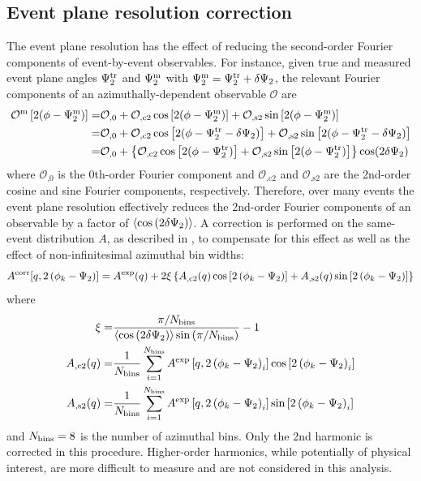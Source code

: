 \subsection{Event plane resolution correction}
\label{subsec:epres_corr}
The event plane resolution has the effect of reducing the second-order Fourier components of event-by-event observables.
For instance, given true and measured event plane angles $\Psi_{2}^\textrm{tr}$ and $\Psi_{2}^\textrm{m}$ with $\Psi_{2}^\textrm{m} = \Psi_{2}^\textrm{tr} + \delta\Psi_{2}$, the relevant Fourier components of an azimuthally-dependent observable $\mathcal{O}$ are
\begin{equation}
  \begin{split}
    \mathcal{O}^\textrm{m} \left[2(\phi-\Psi_{2}^\textrm{m})\right] =& \mathcal{O}_\textrm{,0} + \mathcal{O}_\textrm{,c2} \cos\left[2(\phi - \Psi_{2}^\textrm{m})\right]
    + \mathcal{O}_\textrm{,s2} \sin\left[2(\phi - \Psi_{2}^\textrm{m})\right]\\
    =& \mathcal{O}_\textrm{,0} + \mathcal{O}_\textrm{,c2} \cos\left[2(\phi - \Psi_{2}^\textrm{tr} - \delta\Psi_{2})\right]
    + \mathcal{O}_\textrm{,s2} \sin\left[2(\phi - \Psi_{2}^\textrm{tr} - \delta\Psi_{2})\right]\\
    =& \mathcal{O}_\textrm{,0} + \left\{\mathcal{O}_\textrm{,c2} \cos\left[2(\phi - \Psi_{2}^\textrm{tr})\right]
    + \mathcal{O}_\textrm{,s2} \sin\left[2(\phi - \Psi_{2}^\textrm{tr})\right]\right\} \cos(2\delta\Psi_{2})
  \end{split}
\end{equation}
where $\mathcal{O}_\textrm{,0}$ is the 0th-order Fourier component and $\mathcal{O}_\textrm{,c2}$ and $\mathcal{O}_\textrm{,s2}$ are the 2nd-order cosine and sine Fourier components, respectively.
Therefore, over many events the event plane resolution effectively reduces the 2nd-order Fourier components of an observable by a factor of $\langle \cos\left(2\delta\Psi_{2}\right) \rangle$.
A correction is performed on the same-event distribution $A$, as described in , to compensate for this effect as well as the effect of non-infinitesimal azimuthal bin widths:
\begin{equation}
  \label{eq:a_corr}
  A^\textrm{corr}[q,2\left(\phi_{k}-\Psi_{2}\right)] = A^\textrm{exp}(q) + 2\xi \left\{ A_\textrm{,c2}(q) \cos\left[2\left(\phi_{k}-\Psi_{2}\right)\right] + A_\textrm{,s2}(q) \sin\left[2\left(\phi_{k}-\Psi_{2}\right)\right] \right\}
\end{equation}
where
\begin{align}
  \xi =& \frac{\pi/N_\textrm{bins}}{\langle \cos\left(2\delta\Psi_{2}\right) \rangle \sin\left(\pi/N_\textrm{bins}\right)} - 1 \label{eq:xi_def} \\
  A_{,\textrm{c}2}(q) =& \frac{1}{N_\textrm{bins}} \sum_{i=1}^{N_\textrm{bins}} A^\textrm{exp}\left[q,2\left(\phi_{k}-\Psi_{2}\right)_i \right] \cos \left[ 2\left(\phi_{k}-\Psi_{2}\right)_i \right] \\ 
  A_{,\textrm{s}2}(q) =& \frac{1}{N_\textrm{bins}} \sum_{i=1}^{N_\textrm{bins}} A^\textrm{exp}\left[q,2\left(\phi_{k}-\Psi_{2}\right)_i \right] \sin \left[ 2\left(\phi_{k}-\Psi_{2}\right)_i \right]
\end{align}
and $N_\textrm{bins} = 8$ is the number of azimuthal bins.
Only the 2nd harmonic is corrected in this procedure. Higher-order harmonics, while potentially of physical interest, are more difficult to measure and are not considered in this analysis.

